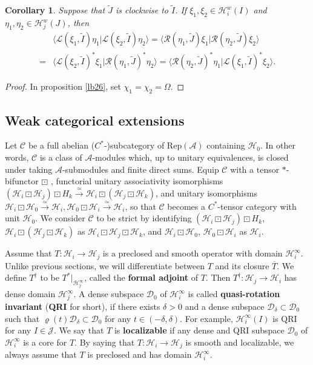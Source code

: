 \documentclass[12pt,a4paper]{article}
\theoremstyle{definition}
\theoremstyle{plain}
\newtheorem{co}[df]{Corollary}
\newcommand{\mc}{\mathcal}
\newcommand{\wtd}{\widetilde}
\newcommand{\ovl}{\overline}
\newcommand{\Rep}{\mathrm{Rep}}
\newcommand{\Dom}{\scr D}
\newcommand{\bk}[1]{\langle {#1}\rangle}
\newcommand{\scr}{\mathscr}
\numberwithin{equation}{subsection}
\begin{document}
\begin{co}\label{lb5}
	Suppose that $\wtd J$ is clockwise to $\wtd I$. If $\xi_1,\xi_2\in\mc H_i^w(I)$ and $\eta_1,\eta_2\in\mc H_j^w(J)$, then 
	\begin{align}
	&\bk{\scr L(\xi_1,\wtd I)\eta_1|\scr L(\xi_2,\wtd I)\eta_2 }=\bk{\scr R(\eta_1,\wtd J)\xi_1|\scr R(\eta_2,\wtd J)\xi_2}\nonumber\\
	=&\bk{\scr L(\xi_2,\wtd I)^*\xi_1|\scr R(\eta_1,\wtd J)^*\eta_2}=\bk{\scr R(\eta_2,\wtd J)^*\eta_1|\scr L(\xi_1,\wtd I)^*\xi_2}.\label{eq6}
	\end{align}
\end{co}

\begin{proof}
In proposition \ref{lb26}, set $\chi_1=\chi_2=\Omega$.
\end{proof}






\subsection{Weak categorical extensions}\label{lb33}

Let $\scr C$ be a full abelian ($C^*$-)subcategory of $\Rep(\mc A)$ containing $\mc H_0$. In other words, $\scr C$ is a class of $\mc A$-modules which, up to unitary equivalences, is closed under taking $\mc A$-submodules and finite direct sums.  Equip $\scr C$  with a tensor $*$-bifunctor $\boxdot$ , functorial unitary associativity isomorphisms $(\mc H_i\boxdot\mc H_j)\boxdot H_k\xrightarrow\simeq\mc H_i\boxdot(\mc H_j\boxdot\mc H_k)$, and unitary isomorphisms $\mc H_i\boxdot\mc H_0\xrightarrow\simeq\mc H_i,\mc H_0\boxdot\mc H_i\xrightarrow\simeq \mc H_i$, so that $\scr C$ becomes a $C^*$-tensor category with unit $\mc H_0$. We consider $\scr C$ to be strict by identifying $(\mc H_i\boxdot\mc H_j)\boxdot H_k$, $\mc H_i\boxdot(\mc H_j\boxdot\mc H_k)$ as $\mc H_i\boxdot\mc H_j\boxdot \mc H_k$, and $\mc H_i\boxdot \mc H_0$, $\mc H_0\boxdot\mc H_i$ as $\mc H_i$. 



Assume that $T:\mc H_i\rightarrow\mc H_j$ is a preclosed and smooth operator with domain $\mc H_i^\infty$. Unlike previous sections, we will differentiate between $T$  and its closure $\ovl T$. We define $T^\dagger$ to be $T^*|_{\mc H_j^\infty}$,  called the \textbf{formal adjoint} of $T$. Then $T^\dagger:\mc H_j\rightarrow\mc H_i$ has  dense domain $\mc H_j^\infty$. A dense subspace $\Dom_0$ of $\mc H_i^\infty$ is called \textbf{quasi-rotation invariant} (\textbf{QRI} for short), if there exists $\delta>0$ and a dense subspace $\Dom_\delta\subset\Dom_0$ such that $\varrho(t)\Dom_\delta\subset\Dom_0$ for any $t\in(-\delta,\delta)$. For example, $\mc H_i^\infty(I)$ is QRI for any $I\in\mc J$. We say that $T$ is \textbf{localizable} if any dense and QRI subspace $\Dom_0$ of $\mc H_i^\infty$ is a core for $T$. By saying that $T:\mc H_i\rightarrow\mc H_j$ is smooth and localizable, we always assume that $T$ is preclosed and has domain $\mc H_i^\infty$.
\end{document}
